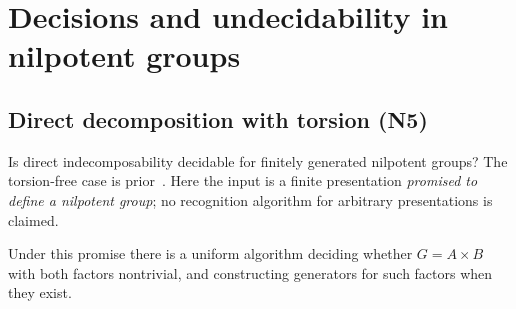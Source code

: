 \section{Decisions and undecidability in nilpotent groups}\label{sec:nilpotent}

\subsection{Direct decomposition with torsion (N5)}\label{sec:n5}
Is direct indecomposability decidable for finitely generated nilpotent
groups? The torsion-free case is prior~\cite{bmo}. Here the input is a
finite presentation \emph{promised to define a nilpotent group}; no
recognition algorithm for arbitrary presentations is claimed.

\begin{theorem}\label{prop:n5}
Under this promise there is a uniform algorithm deciding whether
$G=A\times B$ with both factors nontrivial, and constructing generators
for such factors when they exist.
\end{theorem}
